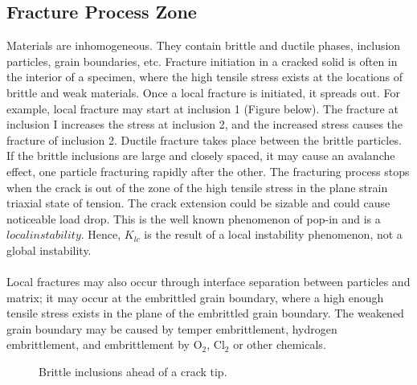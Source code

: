 \documentclass[11pt]{article}
\begin{document}
\subsection{Fracture Process Zone}
Materials are inhomogeneous. They contain brittle and ductile phases, inclusion particles, grain
boundaries, etc. Fracture initiation in a cracked solid is often in the interior of a specimen, where the
high tensile stress exists at the locations of brittle and weak materials. Once a local fracture is initiated,
it spreads out. For example, local fracture may start at inclusion 1 (Figure below). The fracture at inclusion I
increases the stress at inclusion 2, and the increased stress causes the fracture of inclusion 2. Ductile
fracture takes place between the brittle particles. If the brittle inclusions are large and closely spaced, it
may cause an avalanche effect, one particle fracturing rapidly after the other. The fracturing process
stops when the crack is out of the zone of the high tensile stress in the plane strain triaxial state of
tension. The crack extension could be sizable and could cause noticeable load drop. This is the well
known phenomenon of pop-in and is a $local instability$. Hence, $K_{lc}$ is the result of a local instability
phenomenon, not a global instability.
\\\\
Local fractures may also occur through interface separation between particles and matrix; it may
occur at the embrittled grain boundary, where a high enough tensile stress exists in the plane of the
embrittled grain boundary. The weakened grain boundary may be caused by temper embrittlement,
hydrogen embrittlement, and embrittlement by $\text{O}_\text{2}$, $\text{Cl}_\text{2}$ or other chemicals.

\begin{figure}[H]
    \centering
    \captionsetup{labelformat=empty}
    \caption{Brittle inclusions ahead of a crack tip.}
\end{figure}
\end{document}
